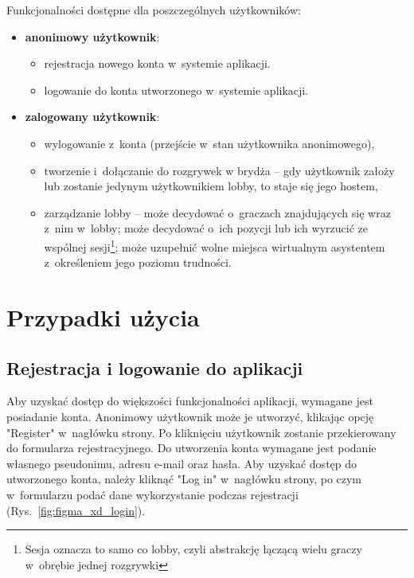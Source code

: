 Funkcjonalności dostępne dla poszczególnych użytkowników:
\begin{itemize}
  \item \textbf{anonimowy użytkownik}:
        \begin{itemize}
          \item rejestracja nowego konta w~systemie aplikacji.
          \item logowanie do konta utworzonego w~systemie aplikacji.
        \end{itemize}

  \item \textbf{zalogowany użytkownik}:
        \begin{itemize}
          \item wylogowanie z~konta (przejście w~stan użytkownika anonimowego),
          \item tworzenie i~dołączanie do rozgrywek w brydża --
                gdy użytkownik założy lub zostanie jedynym
                użytkownikiem lobby, to staje się jego
                hostem,
          \item zarządzanie lobby -- może decydować o~graczach znajdujących się wraz
                z~nim w~lobby; może decydować o~ich pozycji lub ich wyrzucić
                ze wspólnej sesji\footnote{Sesja oznacza to samo co lobby, czyli
                  abstrakcję łączącą wielu graczy w~obrębie jednej
                  rozgrywki};
                może uzupełnić wolne miejsca wirtualnym asystentem
                z~określeniem jego poziomu trudności.
        \end{itemize}
\end{itemize}

\FloatBarrier

\section{Przypadki użycia}

\subsection{Rejestracja i logowanie do aplikacji}

Aby uzyskać dostęp do większości funkcjonalności aplikacji, wymagane
jest posiadanie konta. Anonimowy użytkownik może je utworzyć, klikając
opcję "Register"\xspace w~nagłówku strony. Po kliknięciu użytkownik
zostanie przekierowany do formularza rejestracyjnego.
Do utworzenia konta wymagane jest podanie własnego
pseudonimu, adresu e-mail oraz hasła. Aby uzyskać dostęp do utworzonego
konta, należy kliknąć "Log in"\xspace w~nagłówku strony, po czym
w~formularzu podać dane wykorzystanie podczas rejestracji (Rys.~\ref{fig:figma_xd_login}).

